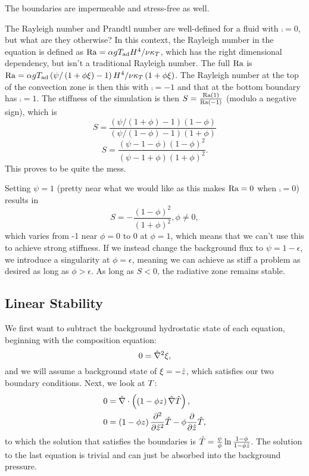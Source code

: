 	The boundaries are impermeable and stress-free as well.

	The Rayleigh number and Prandtl number are well-defined for a fluid with $\comp=0$, but what are they otherwise?
		In this context, the Rayleigh number in the equation is defined as $\mathrm{Ra}=\alpha g T_{\mathrm{ad}} H^{4}/\nu\kappa_{T}$, which has the right dimensional dependency, but isn't a traditional Rayleigh number.
			The full $\mathrm{Ra}$ is $\mathrm{Ra}=\alpha g T_{\mathrm{ad}} \left(\psi/\left(1 + \phi\xi\right) - 1\right) H^{4}/\nu\kappa_{T}\left(1+\phi\xi\right)$.
			The Rayleigh number at the top of the convection zone is then this with $\comp=-1$ and that at the bottom boundary has $\comp=1$.
		The stiffness of the simulation is then $S=\frac{\mathrm{Ra}\left(1\right)}{\mathrm{Ra}\left(-1\right)}$ (modulo a negative sign), which is
		\begin{equation}
			S=\frac{\left(\psi/\left(1 + \phi\right) - 1\right)\left(1-\phi\right)}{\left(\psi/\left(1 - \phi\right) - 1\right)\left(1+\phi\right)}
		\end{equation}
		\begin{equation}
			S=\frac{\left(\psi - 1 - \phi\right)\left(1-\phi\right)^{2}}{\left(\psi - 1 + \phi\right)\left(1+\phi\right)^{2}}.
		\end{equation}
		This proves to be quite the mess.

	Setting $\psi=1$ (pretty near what we would like as this makes $\mathrm{Ra}=0$ when $\comp=0$) results in
		\begin{equation}
			S=-\frac{\left(1-\phi\right)^{2}}{\left(1+\phi\right)^{2}},\phi\ne0,
		\end{equation}
		which varies from -1 near $\phi=0$ to 0 at $\phi=1$, which means that we can't use this to achieve strong stiffness.
		If we instead change the background flux to $\psi=1-\epsilon$, we introduce a singularity at $\phi=\epsilon$, meaning we can achieve as stiff a problem as desired as long as $\phi>\epsilon$.
		As long as $S<0$, the radiative zone remains stable.


\subsection{Linear Stability} %
\label{sub:linear_stability}

	We first want to subtract the background hydrostatic state of each equation, beginning with the composition equation:
	\begin{equation}
		0=\hat{\nabla}^{2}\xi,
	\end{equation}
	and we will assume a background state of $\xi=-\hat{z}$, which satisfies our two boundary conditions.
	Next, we look at $T$:
	\begin{align}
		0&=\hat{\nabla}\cdot\left(\left(1-\phi z\right)\hat{\nabla}\hat{T}\right),\\
		0&=\left(1-\phi z\right)\frac{\partial^{2}}{\partial \hat{z}^{2}}\hat{T}-\phi\frac{\partial}{\partial \hat{z}}\hat{T},\\
	\end{align}
	to which the solution that satisfies the boundaries is $\hat{T}=\frac{\psi}{\phi}\ln{\frac{1-\phi}{1-\phi \hat{z}}}$.
	The solution to the last equation is trivial and can just be absorbed into the background pressure.

